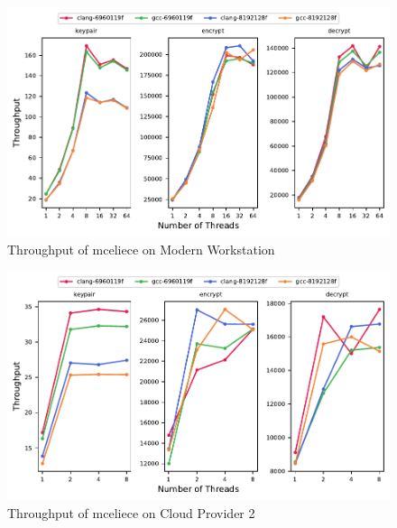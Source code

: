 \begin{figure}
    \centering
    \includegraphics[scale=0.75]{chapters/results/throughput/Modern Workstation_mceliece.pdf}
    \caption{Throughput of \gls{mceliece} on Modern Workstation}
    \label{figure:results:throughput:mceliece:modern-workstation}
\end{figure}

\begin{figure}
    \centering
    \includegraphics[scale=0.75]{chapters/results/throughput/Cloud Provider 2_mceliece.pdf}
    \caption{Throughput of \gls{mceliece} on Cloud Provider 2}
    \label{figure:results:throughput:mceliece:cloud-provider-2}
\end{figure}







